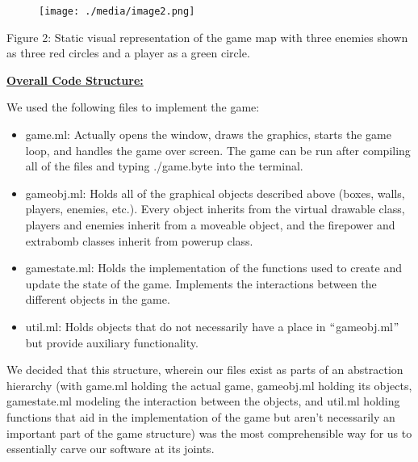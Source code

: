 \documentclass[12pt]{article}
\begin{document}

\begin{figure}[H]
\advance\leftskip 0.0in		\texttt{[image: ./media/image2.png]}
\end{figure}



Figure 2: Static visual representation of the game map with three enemies shown as three red circles and a player as a green circle.\par


\vspace{\baselineskip}
\textbf{\uline{Overall Code Structure:}}\par

We used the following files to implement the game:\par

\begin{itemize}
	\item game.ml: Actually opens the window, draws the graphics, starts the game loop, and handles the game over screen. The game can be run after compiling all of the files and typing ./game.byte into the terminal.\par

	\item gameobj.ml: Holds all of the graphical objects described above (boxes, walls, players, enemies, etc.). Every object inherits from the virtual drawable class, players and enemies inherit from a moveable object, and the firepower and extrabomb classes inherit from powerup class.\par

	\item gamestate.ml: Holds the implementation of the functions used to create and update the state of the game. Implements the interactions between the different objects in the game.\par

	\item util.ml: Holds objects that do not necessarily have a place in $``$gameobj.ml$"$  but provide auxiliary functionality.
\end{itemize}\par

We decided that this structure, wherein our files exist as parts of an abstraction hierarchy (with game.ml holding the actual game, gameobj.ml holding its objects, gamestate.ml modeling the interaction between the objects, and util.ml holding functions that aid in the implementation of the game but aren't necessarily an important part of the game structure) was the most comprehensible way for us to essentially carve our software at its joints.\par
\end{document}
